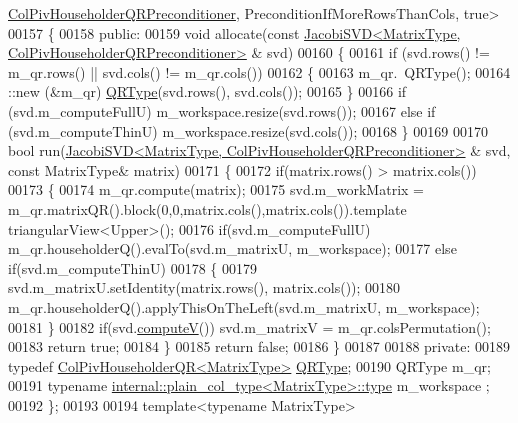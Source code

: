 \begin{DoxyCode}
      \hyperlink{group__enums_gga46eba0d5c621f590b8cf1b53af31d56eaebc52a2365eec1df700ea97bd7af2d9a}{ColPivHouseholderQRPreconditioner}, PreconditionIfMoreRowsThanCols, true>
00157 \{
00158 \textcolor{keyword}{public}:
00159   \textcolor{keywordtype}{void} allocate(\textcolor{keyword}{const} \hyperlink{group___s_v_d___module_class_eigen_1_1_jacobi_s_v_d}{JacobiSVD<MatrixType, ColPivHouseholderQRPreconditioner>}
      & svd)
00160   \{
00161     \textcolor{keywordflow}{if} (svd.rows() != m\_qr.rows() || svd.cols() != m\_qr.cols())
00162     \{
00163       m\_qr.~QRType();
00164       ::new (&m\_qr) \hyperlink{group___q_r___module}{QRType}(svd.rows(), svd.cols());
00165     \}
00166     \textcolor{keywordflow}{if} (svd.m\_computeFullU) m\_workspace.resize(svd.rows());
00167     \textcolor{keywordflow}{else} \textcolor{keywordflow}{if} (svd.m\_computeThinU) m\_workspace.resize(svd.cols());
00168   \}
00169 
00170   \textcolor{keywordtype}{bool} run(\hyperlink{group___s_v_d___module_class_eigen_1_1_jacobi_s_v_d}{JacobiSVD<MatrixType, ColPivHouseholderQRPreconditioner>}
      & svd, \textcolor{keyword}{const} MatrixType& matrix)
00171   \{
00172     \textcolor{keywordflow}{if}(matrix.rows() > matrix.cols())
00173     \{
00174       m\_qr.compute(matrix);
00175       svd.m\_workMatrix = m\_qr.matrixQR().block(0,0,matrix.cols(),matrix.cols()).\textcolor{keyword}{template} 
      triangularView<Upper>();
00176       \textcolor{keywordflow}{if}(svd.m\_computeFullU) m\_qr.householderQ().evalTo(svd.m\_matrixU, m\_workspace);
00177       \textcolor{keywordflow}{else} \textcolor{keywordflow}{if}(svd.m\_computeThinU)
00178       \{
00179         svd.m\_matrixU.setIdentity(matrix.rows(), matrix.cols());
00180         m\_qr.householderQ().applyThisOnTheLeft(svd.m\_matrixU, m\_workspace);
00181       \}
00182       \textcolor{keywordflow}{if}(svd.\hyperlink{group___s_v_d___module_a5f12efcb791eb007d4a4890ac5255ac4}{computeV}()) svd.m\_matrixV = m\_qr.colsPermutation();
00183       \textcolor{keywordflow}{return} \textcolor{keyword}{true};
00184     \}
00185     \textcolor{keywordflow}{return} \textcolor{keyword}{false};
00186   \}
00187 
00188 \textcolor{keyword}{private}:
00189   \textcolor{keyword}{typedef} \hyperlink{group___q_r___module}{ColPivHouseholderQR<MatrixType>} \hyperlink{group___q_r___module}{QRType};
00190   QRType m\_qr;
00191   \textcolor{keyword}{typename} \hyperlink{class_eigen_1_1internal_1_1_tensor_lazy_evaluator_writable}{internal::plain\_col\_type<MatrixType>::type} m\_workspace
      ;
00192 \};
00193 
00194 \textcolor{keyword}{template}<\textcolor{keyword}{typename} MatrixType>

\end{DoxyCode}
